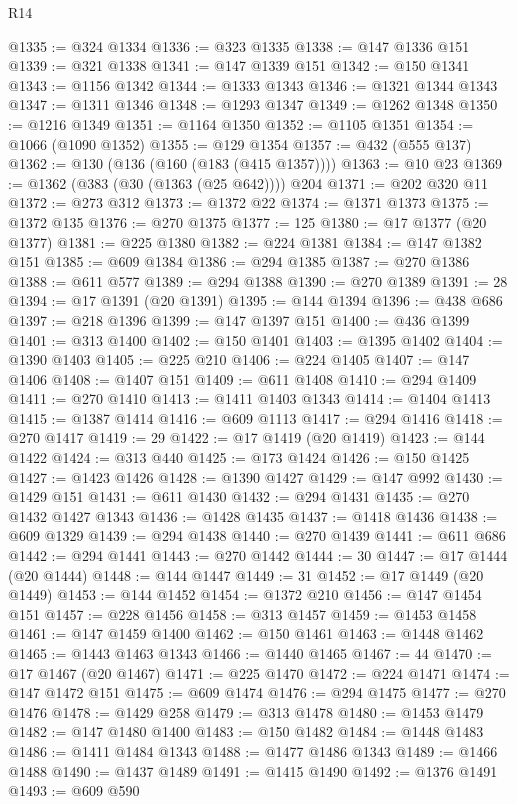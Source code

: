 \begin{lexlean}{R14}
\begin{coremodule}
@1335 := @324 @1334
@1336 := @323 @1335
@1338 := @147 @1336 @151
@1339 := @321 @1338
@1341 := @147 @1339 @151
@1342 := @150 @1341
@1343 := @1156 @1342
@1344 := @1333 @1343
@1346 := @1321 @1344 @1343
@1347 := @1311 @1346
@1348 := @1293 @1347
@1349 := @1262 @1348
@1350 := @1216 @1349
@1351 := @1164 @1350
@1352 := @1105 @1351
@1354 := @1066 (@1090 @1352)
@1355 := @129 @1354
@1357 := @432 (@555 @137)
@1362 := @130 (@136 (@160 (@183 (@415 @1357))))
@1363 := @10 @23
@1369 := @1362 (@383 (@30 (@1363 (@25 @642)))) @204
@1371 := @202 @320 @11
@1372 := @273 @312
@1373 := @1372 @22
@1374 := @1371 @1373
@1375 := @1372 @135
@1376 := @270 @1375
@1377 := 125
@1380 := @17 @1377 (@20 @1377)
@1381 := @225 @1380
@1382 := @224 @1381
@1384 := @147 @1382 @151
@1385 := @609 @1384
@1386 := @294 @1385
@1387 := @270 @1386
@1388 := @611 @577
@1389 := @294 @1388
@1390 := @270 @1389
@1391 := 28
@1394 := @17 @1391 (@20 @1391)
@1395 := @144 @1394
@1396 := @438 @686
@1397 := @218 @1396
@1399 := @147 @1397 @151
@1400 := @436 @1399
@1401 := @313 @1400
@1402 := @150 @1401
@1403 := @1395 @1402
@1404 := @1390 @1403
@1405 := @225 @210
@1406 := @224 @1405
@1407 := @147 @1406
@1408 := @1407 @151
@1409 := @611 @1408
@1410 := @294 @1409
@1411 := @270 @1410
@1413 := @1411 @1403 @1343
@1414 := @1404 @1413
@1415 := @1387 @1414
@1416 := @609 @1113
@1417 := @294 @1416
@1418 := @270 @1417
@1419 := 29
@1422 := @17 @1419 (@20 @1419)
@1423 := @144 @1422
@1424 := @313 @440
@1425 := @173 @1424
@1426 := @150 @1425
@1427 := @1423 @1426
@1428 := @1390 @1427
@1429 := @147 @992
@1430 := @1429 @151
@1431 := @611 @1430
@1432 := @294 @1431
@1435 := @270 @1432 @1427 @1343
@1436 := @1428 @1435
@1437 := @1418 @1436
@1438 := @609 @1329
@1439 := @294 @1438
@1440 := @270 @1439
@1441 := @611 @686
@1442 := @294 @1441
@1443 := @270 @1442
@1444 := 30
@1447 := @17 @1444 (@20 @1444)
@1448 := @144 @1447
@1449 := 31
@1452 := @17 @1449 (@20 @1449)
@1453 := @144 @1452
@1454 := @1372 @210
@1456 := @147 @1454 @151
@1457 := @228 @1456
@1458 := @313 @1457
@1459 := @1453 @1458
@1461 := @147 @1459 @1400
@1462 := @150 @1461
@1463 := @1448 @1462
@1465 := @1443 @1463 @1343
@1466 := @1440 @1465
@1467 := 44
@1470 := @17 @1467 (@20 @1467)
@1471 := @225 @1470
@1472 := @224 @1471
@1474 := @147 @1472 @151
@1475 := @609 @1474
@1476 := @294 @1475
@1477 := @270 @1476
@1478 := @1429 @258
@1479 := @313 @1478
@1480 := @1453 @1479
@1482 := @147 @1480 @1400
@1483 := @150 @1482
@1484 := @1448 @1483
@1486 := @1411 @1484 @1343
@1488 := @1477 @1486 @1343
@1489 := @1466 @1488
@1490 := @1437 @1489
@1491 := @1415 @1490
@1492 := @1376 @1491
@1493 := @609 @590

\end{coremodule}
\end{lexlean}
